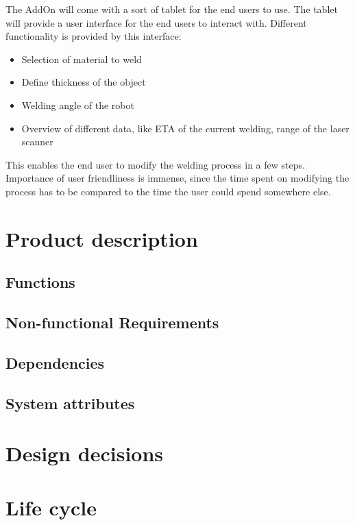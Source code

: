\documentclass[12pt]{report} %
\begin{document}
The AddOn will come with a sort of tablet for the end users to use. The tablet will provide a user interface for the end users to interact with. Different functionality is provided by this interface: 

\begin{itemize}

\item Selection of material to weld 
\item Define thickness of the object
\item Welding angle of the robot
\item Overview of different data, like ETA of the current welding, range of the laser scanner

\end{itemize}

This enables the end user to modify the welding process in a few steps. Importance of user friendliness is immense, since the time spent on modifying the process has to be compared to the time the user could spend somewhere else.

\section{Product description}

\subsection{Functions}

\subsection{Non-functional Requirements}

\subsection{Dependencies}

\subsection{System attributes}

\section{Design decisions}

\section{Life cycle}
\end{document}
